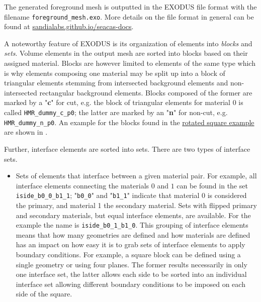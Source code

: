 The generated foreground mesh is outputted in the EXODUS file format with the filename \texttt{foreground\_mesh.exo}. More details on the file format in general can be found at \href{https://sandialabs.github.io/seacas-docs/html/index.html}{sandialabs.github.io/seacas-docs}.

\vspace{0.2cm}

A noteworthy feature of EXODUS is its organization of elements into \emph{blocks} and \emph{sets}. Volume elements in the output mesh are sorted into blocks based on their assigned material. Blocks are however limited to elements of the same type which is why elements composing one material may be split up into a block of triangular elements stemming from intersected background elements and non-intersected rectangular background elements. Blocks composed of the former are marked by a "\textbf{c}" for cut, e.g. the block of triangular elements for material $0$ is called \texttt{HMR\_dummy\_c\_p0}; the latter are marked by an "\textbf{n}" for non-cut, e.g. \texttt{HMR\_dummy\_n\_p0}.
An example for the blocks found in the \href{https://github.com/kkmaute/moris/blob/main/share/doc/mesh_generation/examples/Rotated_Square_Example.xml}{rotated square example} are shown in .

Further, interface elements are sorted into sets. There are two types of interface sets.
\begin{itemize}
    \item Sets of elements that interface between a given material pair. For example, all interface elements connecting the materials $0$ and $1$ can be found in the set \texttt{iside\_b0\_0\_b1\_1}; "\texttt{b0\_0}" and "\texttt{b1\_1}" indicate that material 0 is considered the primary, and material 1 the secondary material. Sets with flipped primary and secondary materials, but equal interface elements, are available. For the example the name is \texttt{iside\_b0\_1\_b1\_0}. 
    This grouping of interface elements means that how many geometries are defined and how materials are defined has an impact on how easy it is to grab sets of interface elements to apply boundary conditions. For example, a square block can be defined using a single geometry or using four planes. The former results necessarily in only one interface set, the latter allows each side to be sorted into an individual interface set allowing different boundary conditions to be imposed on each side of the square.
\end{itemize}

